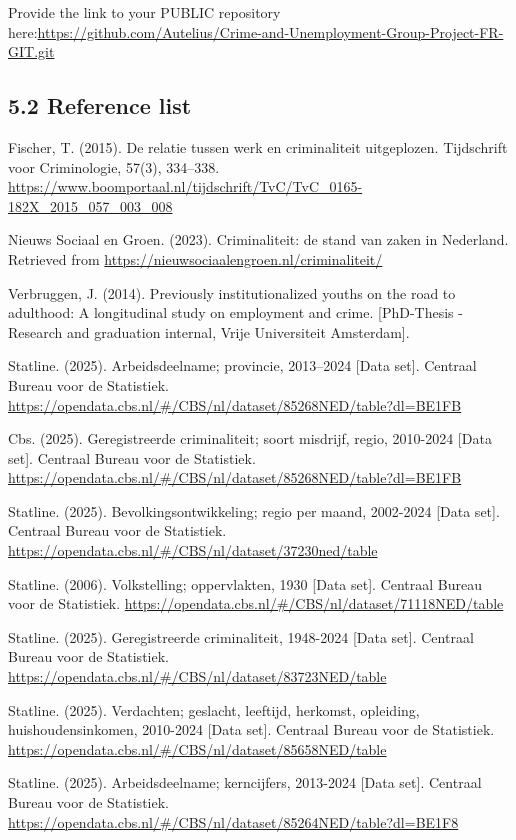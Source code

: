 \documentclass[
]{article}
\begin{document}
Provide the link to your PUBLIC repository
here:\url{https://github.com/Autelius/Crime-and-Unemployment-Group-Project-FR-GIT.git}

\subsection{5.2 Reference list}\label{reference-list}

Fischer, T. (2015). De relatie tussen werk en criminaliteit uitgeplozen.
Tijdschrift voor Criminologie, 57(3), 334--338.
\url{https://www.boomportaal.nl/tijdschrift/TvC/TvC_0165-182X_2015_057_003_008}

Nieuws Sociaal en Groen. (2023). Criminaliteit: de stand van zaken in
Nederland. Retrieved from
\url{https://nieuwsociaalengroen.nl/criminaliteit/}

Verbruggen, J. (2014). Previously institutionalized youths on the road
to adulthood: A longitudinal study on employment and crime.
{[}PhD-Thesis - Research and graduation internal, Vrije Universiteit
Amsterdam{]}.

Statline. (2025). Arbeidsdeelname; provincie, 2013--2024 {[}Data set{]}.
Centraal Bureau voor de Statistiek.
\url{https://opendata.cbs.nl/\#/CBS/nl/dataset/85268NED/table?dl=BE1FB}

Cbs. (2025). Geregistreerde criminaliteit; soort misdrijf, regio,
2010-2024 {[}Data set{]}. Centraal Bureau voor de Statistiek.
\url{https://opendata.cbs.nl/\#/CBS/nl/dataset/85268NED/table?dl=BE1FB}

Statline. (2025). Bevolkingsontwikkeling; regio per maand, 2002-2024
{[}Data set{]}. Centraal Bureau voor de Statistiek.
\url{https://opendata.cbs.nl/\#/CBS/nl/dataset/37230ned/table}

Statline. (2006). Volkstelling; oppervlakten, 1930 {[}Data set{]}.
Centraal Bureau voor de Statistiek.
\url{https://opendata.cbs.nl/\#/CBS/nl/dataset/71118NED/table}

Statline. (2025). Geregistreerde criminaliteit, 1948-2024 {[}Data
set{]}. Centraal Bureau voor de Statistiek.
\url{https://opendata.cbs.nl/\#/CBS/nl/dataset/83723NED/table}

Statline. (2025). Verdachten; geslacht, leeftijd, herkomst, opleiding,
huishoudensinkomen, 2010-2024 {[}Data set{]}. Centraal Bureau voor de
Statistiek.
\url{https://opendata.cbs.nl/\#/CBS/nl/dataset/85658NED/table}

Statline. (2025). Arbeidsdeelname; kerncijfers, 2013-2024 {[}Data
set{]}. Centraal Bureau voor de Statistiek.
\url{https://opendata.cbs.nl/\#/CBS/nl/dataset/85264NED/table?dl=BE1F8}
\end{document}
